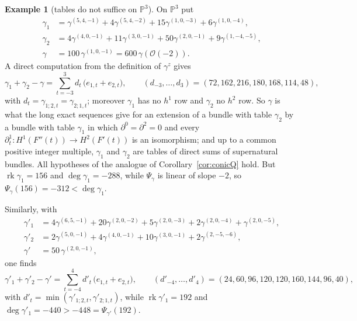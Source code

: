\documentclass[11pt]{amsart}
\theoremstyle{definition}
\newtheorem{example}[theorem]{Example}
\theoremstyle{remark}
\newcommand{\PP}{\mathbb{P}}
\newcommand{\OO}{\mathcal{O}}
\DeclareMathOperator{\rk}{rk}
\begin{document}
\begin{example}[tables do not suffice on $\PP^3$]\label{ex:conicP3}
On $\PP^3$ put
\begin{align*}
\gamma_1&=\gamma^{(5,4,-1)}+4\gamma^{(5,4,-2)}+15\gamma^{(1,0,-3)}+6\gamma^{(1,0,-4)},\\
\gamma_2&=4\gamma^{(4,0,-1)}+11\gamma^{(3,0,-1)}+50\gamma^{(2,0,-1)}+9\gamma^{(1,-4,-5)},\\
\gamma&=100\,\gamma^{(1,0,-1)}=600\,\gamma(\OO(-2)).
\end{align*}
A direct computation from the definition of $\gamma^z$ gives
\[
\gamma_1+\gamma_2-\gamma=\sum_{t=-3}^{3}d_t\,\big(e_{1,t}+e_{2,t}\big),\qquad (d_{-3},\dots,d_3)=(72,162,216,180,168,114,48),
\]
with $d_t=\gamma_{1;2,t}=\gamma_{2;1,t}$; moreover $\gamma_1$ has no $h^1$ row and $\gamma_2$ no $h^2$ row. So $\gamma$ is what the long exact sequences give for an extension of a bundle with table $\gamma_2$ by a bundle with table $\gamma_1$ in which $\partial^0=\partial^2=0$ and every $\partial^1_t\colon H^1(F''(t))\to H^2(F'(t))$ is an isomorphism; and up to a common positive integer multiple, $\gamma_1$ and $\gamma_2$ are tables of direct sums of supernatural bundles. All hypotheses of the analogue of Corollary~\ref{cor:conicQ} hold. But $\rk\gamma_1=156$ and $\deg\gamma_1=-288$, while $\Psi_\gamma$ is linear of slope $-2$, so $\Psi_\gamma(156)=-312<\deg\gamma_1$.

Similarly, with
\begin{align*}
\gamma'_1&=4\gamma^{(6,5,-1)}+20\gamma^{(2,0,-2)}+5\gamma^{(2,0,-3)}+2\gamma^{(2,0,-4)}+\gamma^{(2,0,-5)},\\
\gamma'_2&=2\gamma^{(5,0,-1)}+4\gamma^{(4,0,-1)}+10\gamma^{(3,0,-1)}+2\gamma^{(2,-5,-6)},\\
\gamma'&=50\,\gamma^{(2,0,-1)},
\end{align*}
one finds
\[
\gamma'_1+\gamma'_2-\gamma'=\sum_{t=-4}^{4}d'_t\,\big(e_{1,t}+e_{2,t}\big),\qquad (d'_{-4},\dots,d'_4)=(24,60,96,120,120,160,144,96,40),
\]
with $d'_t=\min(\gamma'_{1;2,t},\gamma'_{2;1,t})$, while $\rk\gamma'_1=192$ and $\deg\gamma'_1=-440>-448=\Psi_{\gamma'}(192)$.
\end{example}
\end{document}
